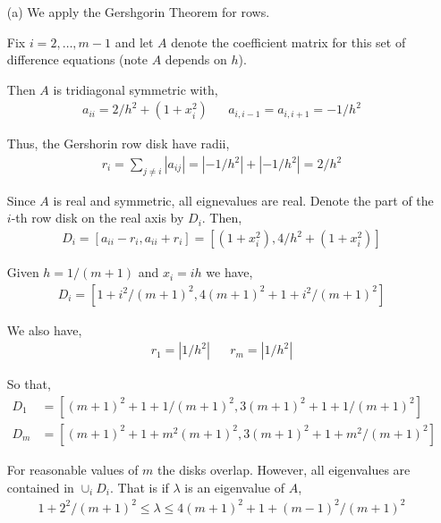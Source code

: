 \documentclass[10pt]{article}
\begin{document}
\begin{solution}[Solution]

\begin{enumerate}
    \item[(a)] We apply the Gershgorin Theorem for rows. 


        Fix \( i=2,\ldots, m-1 \) and let \( A \) denote the coefficient matrix for this set  of difference equations (note \( A \) depends on \( h \)).

        Then \( A \) is tridiagonal symmetric with,
        \begin{align*}
            a_{ii} = 2/h^2 + (1+x_i^2) && a_{i,i-1} = a_{i,i+1} = -1/h^2
        \end{align*}

        Thus, the Gershorin row disk have radii,
        \begin{align*}
            r_i = \sum_{j\neq i} |a_{ij}| = |-1/h^2|+|-1/h^2| = 2/h^2
        \end{align*}
        
        Since \( A \) is real and symmetric, all eignevalues are real. Denote the part of the \( i \)-th row disk on the real axis by \( D_i \). Then,
        \begin{align*}
            D_i = [a_{ii}-r_i, a_{ii}+r_i] = [(1+x_i^2), 4/h^2+(1+x_i^2)]
        \end{align*}
        
        Given \( h = 1/(m+1) \) and \( x_i = ih \) we have,
        \begin{align*}
            D_i = [1+i^2/(m+1)^2, 4(m+1)^2+1+i^2/(m+1)^2]
        \end{align*}

        We also have,
        \begin{align*}
            r_1 = |1/h^2| && r_m = |1/h^2|
        \end{align*}

        So that,
        \begin{align*}
            D_1 &= [(m+1)^2+1+1/(m+1)^2,3(m+1)^2+1+1/(m+1)^2] 
            \\D_m &= [(m+1)^2+1+m^2(m+1)^2, 3(m+1)^2 +1+m^2/(m+1)^2]
        \end{align*}

        For reasonable values of \( m \) the disks overlap. However, all eigenvalues are contained in \( \cup_i D_i \). That is if \( \lambda \) is an eigenvalue of \( A \), 
        \begin{align*}
            1 + 2^2/(m+1)^2\leq \lambda \leq 4(m+1)^2 + 1 + (m-1)^2/(m+1)^2
        \end{align*}



\end{enumerate}
\end{solution}
\end{document}
